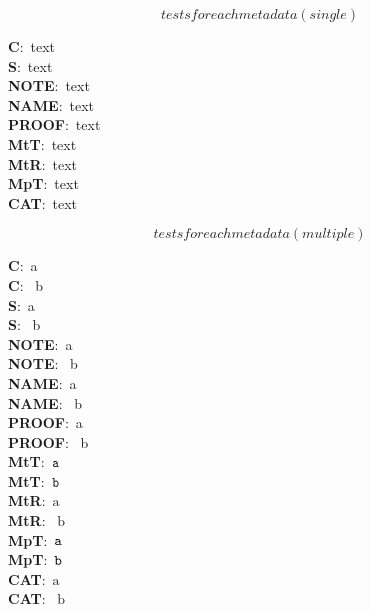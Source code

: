 \documentclass{article}
\begin{document}


\begin{equation}
  tests for each metadata (single)
\end{equation}
\begin{flushright}
   {\bf C}:~text \\[0.2cm]
   {\bf S}:~text \\[0.2cm]
   {\bf NOTE}:~text \\[0.2cm]
   {\bf NAME}:~text \\[0.2cm]
   {\bf PROOF}:~text \\[0.2cm]
   {\bf MtT}:~text \\[0.2cm]
   {\bf MtR}:~text \\[0.2cm]
   {\bf MpT}:~text \\[0.2cm]
   {\bf CAT}:~text
\end{flushright}

\begin{equation}
  tests for each metadata (multiple)
\end{equation}
\begin{flushright}
   {\bf C}:~a \\[0.2cm]
   {\bf C}:~ b \\[0.2cm]
   {\bf S}:~a \\[0.2cm]
   {\bf S}:~ b \\[0.2cm]
   {\bf NOTE}:~a \\[0.2cm]
   {\bf NOTE}:~ b \\[0.2cm]
   {\bf NAME}:~a \\[0.2cm]
   {\bf NAME}:~ b \\[0.2cm]
   {\bf PROOF}:~a \\[0.2cm]
   {\bf PROOF}:~ b \\[0.2cm]
   {\bf MtT}:~${\displaystyle \tt{a }}$ \\[0.2cm]
   {\bf MtT}:~${\displaystyle \tt{ b}}$ \\[0.2cm]
   {\bf MtR}:~${\displaystyle \text{a }}$ \\[0.2cm]
   {\bf MtR}:~${\displaystyle \text{ b}}$ \\[0.2cm]
   {\bf MpT}:~${\displaystyle \tt{a }}$ \\[0.2cm]
   {\bf MpT}:~${\displaystyle \tt{ b}}$ \\[0.2cm]
   {\bf CAT}:~${\displaystyle \text{a }}$ \\[0.2cm]
   {\bf CAT}:~${\displaystyle \text{ b}}$
\end{flushright}
\end{document}
